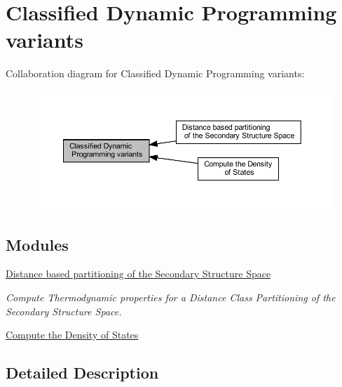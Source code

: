 \hypertarget{group__class__fold}{}\section{Classified Dynamic Programming variants}
\label{group__class__fold}
Collaboration diagram for Classified Dynamic Programming variants\+:
\nopagebreak
\begin{figure}[H]
\begin{center}
\leavevmode
\includegraphics[width=350pt]{group__class__fold}
\end{center}
\end{figure}
\subsection*{Modules}
\begin{DoxyCompactItemize}
\item 
\hyperlink{group__kl__neighborhood}{Distance based partitioning of the Secondary Structure Space}
\begin{DoxyCompactList}\small\item\em Compute Thermodynamic properties for a Distance Class Partitioning of the Secondary Structure Space. \end{DoxyCompactList}\item 
\hyperlink{group__dos}{Compute the Density of States}
\end{DoxyCompactItemize}


\subsection{Detailed Description}
